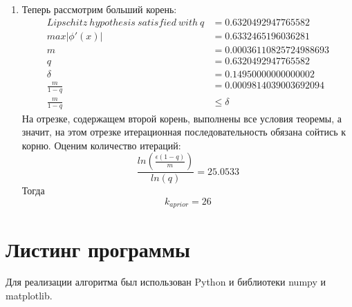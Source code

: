 \documentclass[14pt, a4paper]{article}
\begin{document}
\begin{itemize}
\begin{enumerate}
    \item
    Теперь рассмотрим больший корень:
\begin{align*}
Lipschitz\ hypothesis\ satisfied\ with\ q &= 0.6320492947765582\\
max|\phi'(x)| &= 0.6332465196036281\\
m &= 0.00036110825724988693\\
q &= 0.6320492947765582\\
\delta &= 0.14950000000000002\\
\frac{m}{1 - q} &= 0.0009814039003692094\\
\frac{m}{1 - q} &\leq \delta
\end{align*}
    На отрезке, содержащем второй корень, выполнены все условия теоремы, а значит, на этом отрезке итерационная последовательность обязана сойтись к корню.
    Оценим количество итераций: \begin{equation}\frac{ln(\frac{\epsilon(1-q)}{m})}{ln(q)} = 25.0533\end{equation}
    Тогда \begin{equation}k_{aprior} = 26\end{equation}

    \end{enumerate}
  \end{itemize}
  \section{Листинг программы}
  Для реализации алгоритма был использован Python и библиотеки numpy и matplotlib.
\end{document}
